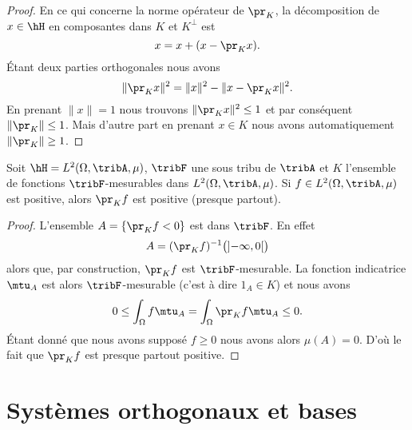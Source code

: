 \begin{proof}
    En ce qui concerne la norme opérateur de \( \pr_K\), la décomposition de \( x\in\hH\) en composantes dans \( K\) et \( K^{\perp}\) est
    \begin{equation}
        x=x+(x-\pr_Kx).
    \end{equation}
    Étant deux parties orthogonales nous avons
    \begin{equation}
        \| \pr_Kx \|^2=\| x \|^2-\| x-\pr_Kx \|^2.
    \end{equation}
    En prenant \( \| x \|=1\) nous trouvons \( \| \pr_Kx \|^2\leq 1\) et par conséquent \( \| \pr_K \|\leq 1\). Mais d'autre part en prenant \( x\in K\) nous avons automatiquement \( \| \pr_K \|\geq 1\).
\end{proof}

\begin{proposition}
    Soit \( \hH=L^2(\Omega,\tribA,\mu)\), \( \tribF\) une sous tribu de \( \tribA\) et \( K\) l'ensemble de fonctions \( \tribF\)-mesurables dans \( L^2(\Omega,\tribA,\mu)\). Si \( f\in L^2(\Omega,\tribA,\mu)\) est positive, alors \( \pr_Kf\) est positive (presque partout).
\end{proposition}

\begin{proof}
    L'ensemble \( A=\{ \pr_Kf<0 \}\) est dans \( \tribF\). En effet
    \begin{equation}
        A=(\pr_Kf)^{-1}\big( \mathopen] -\infty , 0 \mathclose[\big)
    \end{equation}
    alors que, par construction, \( \pr_Kf\) est \( \tribF\)-mesurable. La fonction indicatrice \( \mtu_A\) est alors \( \tribF\)-mesurable (c'est à dire \( 1_A\in K\)) et nous avons
    \begin{equation}
        0\leq\int_{\Omega}f\mtu_A=\int_{\Omega}\pr_Kf\mtu_A\leq 0.
    \end{equation}
    Étant donné que nous avons supposé \( f\geq 0\) nous avons alors \( \mu(A)=0\). D'où le fait que \( \pr_Kf\) est presque partout positive.
\end{proof}


\section{Systèmes orthogonaux et bases}


